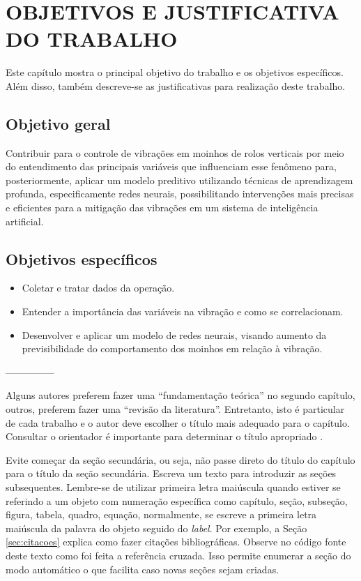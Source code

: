 \section{OBJETIVOS E JUSTIFICATIVA DO TRABALHO}

Este capítulo mostra o principal objetivo do trabalho e os objetivos específicos. Além disso, também descreve-se as justificativas para realização deste trabalho.

\subsection{Objetivo geral}

Contribuir para o controle de vibrações em moinhos de rolos verticais por meio do entendimento das principais variáveis que influenciam esse fenômeno para, posteriormente, aplicar um modelo preditivo utilizando técnicas de aprendizagem profunda, especificamente redes neurais, possibilitando intervenções mais precisas e eficientes para a mitigação das vibrações em um sistema de inteligência artificial. 

\subsection{Objetivos específicos}

\begin{itemize}

\item Coletar e tratar dados da operação.
\item Entender a importância das variáveis na vibração e como se correlacionam.
\item Desenvolver e aplicar um modelo de redes neurais, visando aumento da previsibilidade do comportamento dos moinhos em relação à vibração.

\end{itemize}

    ---------------

Alguns autores preferem fazer uma ``fundamentação teórica'' no segundo capítulo, outros, preferem fazer uma ``revisão da literatura''. Entretanto, isto é particular de cada trabalho e o autor deve escolher o título mais adequado para o capítulo. Consultar o orientador é importante para determinar o título apropriado  \cite{lamport1986latex}.



Evite começar da seção secundária, ou seja, não passe direto do título do capítulo para o título da seção secundária. Escreva um texto para introduzir as seções subsequentes. Lembre-se de utilizar primeira letra maiúscula quando estiver se referindo a um objeto com numeração específica como capítulo, seção, subseção, figura, tabela, quadro, equação, normalmente, se escreve a primeira letra maiúscula da palavra do objeto seguido do \textit{label}. Por exemplo, a Seção \ref{sec:citacoes} explica como fazer citações bibliográficas. Observe no código fonte deste texto como foi feita a referência cruzada. Isso permite enumerar a seção do modo automático o que facilita caso novas seções sejam criadas.  

